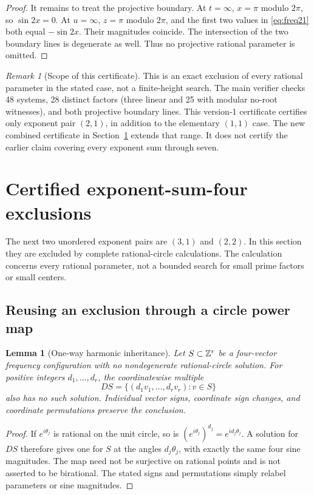 \documentclass[11pt]{article}
\newtheorem{lemma}[theorem]{Lemma}
\theoremstyle{definition}\newtheorem{definition}[theorem]{Definition}
\theoremstyle{remark}\newtheorem{remark}[theorem]{Remark}
\begin{document}
\begin{proof}
It remains to treat the projective boundary. At $t=\infty$, $x=\pi$ modulo $2\pi$, so $\sin2x=0$. At $u=\infty$, $z=\pi$ modulo $2\pi$, and the first two values in \eqref{eq:freq21} both equal $-\sin2x$. Their magnitudes coincide. The intersection of the two boundary lines is degenerate as well. Thus no projective rational parameter is omitted.
\end{proof}

\begin{remark}[Scope of this certificate]
This is an exact exclusion of every rational parameter in the stated case, not a finite-height search. The main verifier checks 48 systems, 28 distinct factors (three linear and 25 with modular no-root witnesses), and both projective boundary lines. This version-1 certificate certifies only exponent pair $(2,1)$, in addition to the elementary $(1,1)$ case. The new combined certificate in Section~\ref{sec:degree4} extends that range. It does not certify the earlier claim covering every exponent sum through seven.
\end{remark}

\section{Certified exponent-sum-four exclusions}\label{sec:degree4}
The next two unordered exponent pairs are $(3,1)$ and $(2,2)$. In this section they are excluded by complete rational-circle calculations. The calculation concerns every rational parameter, not a bounded search for small prime factors or small centers.

\subsection{Reusing an exclusion through a circle power map}
\begin{lemma}[One-way harmonic inheritance]\label{lem:inherit}
Let $S\subset\mathbb Z^r$ be a four-vector frequency configuration with no nondegenerate rational-circle solution. For positive integers $d_1,\ldots,d_r$, the coordinatewise multiple
\[
D S=\{(d_1v_1,\ldots,d_rv_r):v\in S\}
\]
also has no such solution. Individual vector signs, coordinate sign changes, and coordinate permutations preserve the conclusion.
\end{lemma}
\begin{proof}
If $e^{i\theta_j}$ is rational on the unit circle, so is $(e^{i\theta_j})^{d_j}=e^{i d_j\theta_j}$. A solution for $DS$ therefore gives one for $S$ at the angles $d_j\theta_j$, with exactly the same four sine magnitudes. The map need not be surjective on rational points and is not asserted to be birational. The stated signs and permutations simply relabel parameters or sine magnitudes.
\end{proof}
\end{document}
